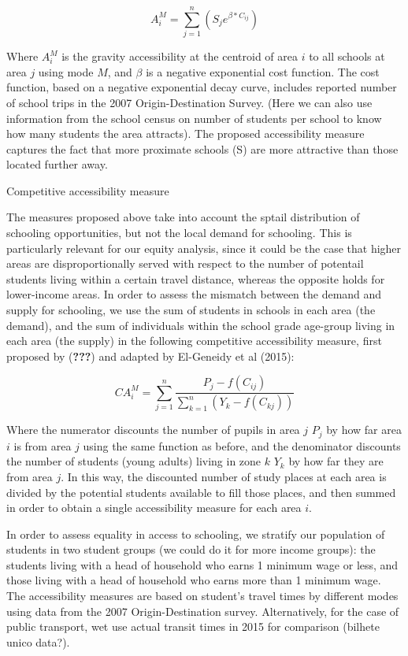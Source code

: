 \documentclass[]{article}
\begin{document}
\[ A_{i}^M= \sum_{j=1}^n(S_{j}e^{\beta*C_{ij}}) \]

Where \(A_{i}^M\) is the gravity accessibility at the centroid of area
\(i\) to all schools at area \(j\) using mode \(M\), and \(\beta\) is a
negative exponential cost function. The cost function, based on a
negative exponential decay curve, includes reported number of school
trips in the 2007 Origin-Destination Survey. (Here we can also use
information from the school census on number of students per school to
know how many students the area attracts). The proposed accessibility
measure captures the fact that more proximate schools (S) are more
attractive than those located further away.

Competitive accessibility measure

The measures proposed above take into account the sptail distribution of
schooling opportunities, but not the local demand for schooling. This is
particularly relevant for our equity analysis, since it could be the
case that higher areas are disproportionally served with respect to the
number of potentail students living within a certain travel distance,
whereas the opposite holds for lower-income areas. In order to assess
the mismatch between the demand and supply for schooling, we use the sum
of students in schools in each area (the demand), and the sum of
individuals within the school grade age-group living in each area (the
supply) in the following competitive accessibility measure, first
proposed by ({\textbf{???}}) and adapted by El-Geneidy et al (2015):

\[ CA_{i}^M= \sum_{j=1}^n\frac{P_{j}-f(C_{ij})}{\sum_{k=1}^n(Y_{k}-f(C_{kj}))}\]

Where the numerator discounts the number of pupils in area \(j\)
\(P_{j}\) by how far area \(i\) is from area \(j\) using the same
function as before, and the denominator discounts the number of students
(young adults) living in zone \(k\) \(Y_{k}\) by how far they are from
area \(j\). In this way, the discounted number of study places at each
area is divided by the potential students available to fill those
places, and then summed in order to obtain a single accessibility
measure for each area \(i\).

In order to assess equality in access to schooling, we stratify our
population of students in two student groups (we could do it for more
income groups): the students living with a head of household who earns 1
minimum wage or less, and those living with a head of household who
earns more than 1 minimum wage. The accessibility measures are based on
student's travel times by different modes using data from the 2007
Origin-Destination survey. Alternatively, for the case of public
transport, wet use actual transit times in 2015 for comparison (bilhete
unico data?).
\end{document}
